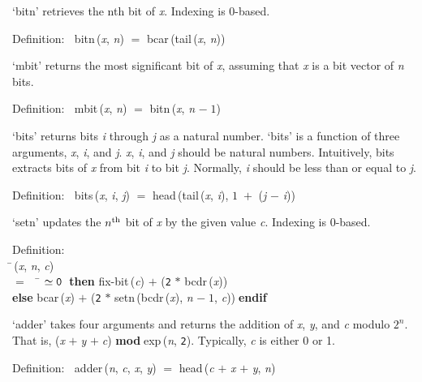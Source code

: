  `bitn' retrieves the nth bit of {\it{x\/}}.  Indexing is 0-based.
\begin{tabbing}{\sc Definition}:$\;\;$
{\rm{bitn}}\,({\it{x\/}}, {\it{n\/}}) $=$ {\rm{bcar}}\,({\rm{tail}}\,({\it{x\/}}, {\it{n\/}}))
\end{tabbing}

 `mbit' returns the most significant bit of {\it{x\/}}, assuming that {\it{x\/}} is a 
 bit vector of {\it{n\/}} bits.
\begin{tabbing}{\sc Definition}:$\;\;$
{\rm{mbit}}\,({\it{x\/}}, {\it{n\/}}) $=$ {\rm{bitn}}\,({\it{x\/}}, {\it{n\/}} $-\;1$)
\end{tabbing}

 `bits' returns bits {\it{i\/}} through {\it{j\/}} as a natural number.  `bits' is a function
 of three arguments, {\it{x\/}}, {\it{i\/}}, and {\it{j\/}}.  {\it{x\/}}, {\it{i\/}}, and {\it{j\/}} should be natural numbers.
 Intuitively, bits extracts bits of {\it{x\/}} from bit {\it{i\/}} to bit {\it{j\/}}.  Normally, {\it{i\/}}
 should be less than or equal to {\it{j\/}}.
\begin{tabbing}{\sc Definition}:$\;\;$
{\rm{bits}}\,({\it{x\/}}, {\it{i\/}}, {\it{j\/}}) $=$ {\rm{head}}\,({\rm{tail}}\,({\it{x\/}}, {\it{i\/}}), $1\;+$ ({\it{j\/}} $-$ {\it{i\/}}))
\end{tabbing}

 `setn' updates the $n^{\rm th}$ bit of {\it{x\/}} by the given value {\it{c\/}}.  Indexing is 0-based.
\begin{tabbing}{\sc Definition}: \\  
\=\,({\it{x\/}}, {\it{n\/}}, {\it{c\/}}) \\ 
$=$$\;\;\;\;$\= $\simeq {\tt{0}}$$\;\;${\bf then }{\rm{fix-bit}}\,({\it{c\/}}) $+$ ({\tt{2}} $*$ {\rm{bcdr}}\,({\it{x\/}})) \\ 
{\bf else }{\rm{bcar}}\,({\it{x\/}}) $+$ ({\tt{2}} $*$ {\rm{setn}}\,({\rm{bcdr}}\,({\it{x\/}}), {\it{n\/}} $-\;1$, {\it{c\/}}))$\;${\bf  endif}\-\-
\end{tabbing}

 `adder' takes four arguments and returns the addition of {\it{x\/}}, {\it{y\/}}, and {\it{c\/}} modulo
 $2^n$.  That is, ({\it{x\/}} $+$$\;${\it{y\/}} $+$$\;${\it{c\/}}) ${}${\bf{mod}}${}$$\;${\rm{exp}}\,({\it{n\/}}, {\tt{2}}).  Typically,  {\it{c\/}} is either 0 or 1.
\begin{tabbing}{\sc Definition}:$\;\;$
{\rm{adder}}\,({\it{n\/}}, {\it{c\/}}, {\it{x\/}}, {\it{y\/}}) $=$ {\rm{head}}\,({\it{c\/}} $+$ {\it{x\/}} $+$ {\it{y\/}}, {\it{n\/}})
\end{tabbing}

